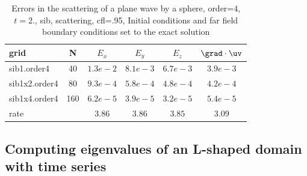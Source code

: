 \begin{table}[hbt]
\begin{center}
\begin{tabular}{|l|c|c|c|c|c|} \hline\hline 
grid  & N &  $E_x$ &  $E_y$ & $E_z$ & $\grad\cdot\uv$\\ \hline 
         sib1.order4 &    40 &$1.3 e-2$ &$8.1 e-3$ &$6.7 e-3$ &$3.9 e-3$  \\ \hline
       sib1x2.order4 &    80 &$9.3 e-4$ &$5.8 e-4$ &$4.8 e-4$ &$4.2 e-4$  \\ \hline
       sib1x4.order4 &   160 &$6.2 e-5$ &$3.9 e-5$ &$3.2 e-5$ &$5.4 e-5$  \\ \hline
    rate            &     &       $3.86$ &       $3.86$ &       $3.85$ &       $3.09$  \\ \hline\hline
\end{tabular}
\caption{Errors in the scattering of a plane wave by a sphere, order=$4$, $t=2.$, sib, scattering, cfl=.95,
   Initial conditions and far field boundary conditions set to the exact solution}\label{table:mx.sib}
\end{center}
\end{table}

\clearpage
\subsection{Computing eigenvalues of an L-shaped domain with time series}

